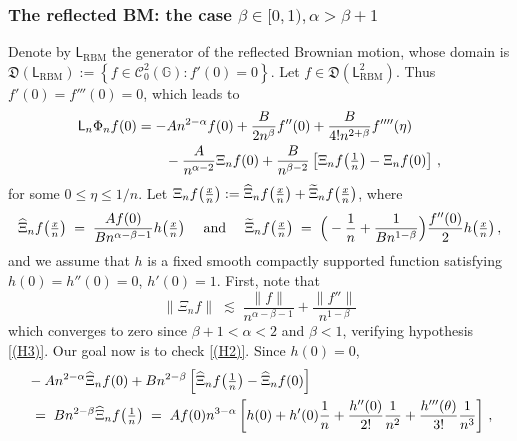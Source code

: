 \documentclass[12pt,a4paper]{article}
\theoremstyle{plain}
\theoremstyle{remark}
\newcommand{\msf}[1]{{\mathsf #1}}
\newcommand{\mc}[1]{{\mathcal #1}}
\newcommand{\mf}[1]{{\mathfrak #1}}
\newcommand{\bb}[1]{{\mathbb #1}}
\newcommand{\norm}[1]{\lVert#1\rVert}
\newcommand{\pfrac}[2]{\genfrac{}{}{}{1}{#1}{#2}}
\newcommand{\pn}[1]{\big(\pfrac{#1}{n}\big)}
\begin{document}
	\subsubsection{The reflected BM: the case \texorpdfstring{$\beta \in [0,1), \alpha >  \beta+1$}{beta in [0,1),  alpha >  beta+1}}
	
	
	
	Denote by $\msf{L}_{\text{RBM}}$ the generator of the reflected Brownian motion, whose domain is
	$
	\mf{D}(\msf{L}_{\text{RBM}}) := \left\{f \in \mc{C}_0^2(\bb{G}): f'(0) = 0\right\}$.
	Let $f \in \mf{D}(\msf{L}_{\text{RBM}}^2)$. Thus $f'(0)  = f'''(0) =0$, which leads to
	\begin{equation}\label{eq:generator_ref}
		\begin{split}
			\msf{L}_n\Phi_nf(0) &= -An^{2 - \alpha}f(0) + \frac{B}{2n^\beta}f''(0) + \frac{B}{4!n^{2 + \beta}}f''''(\eta)\\
			&\qquad  - \frac{A}{n^{\alpha - 2}}\Xi_nf(0) +\frac{B}{n^{\beta - 2}}\left[\Xi_nf\pn{1} - \Xi_nf(0)\right] \,,
		\end{split}
	\end{equation}
	for some $0\leq \eta\leq 1/n$. 
	Let $\Xi_nf\pn{x} :=    \widehat{\Xi}_nf\pn{x} + \widetilde{\Xi}_nf\pn{x}$,
	where
	\begin{align*}
		\widehat{\Xi}_nf\pn{x} \;=\; \frac{Af(0)}{Bn^{\alpha - \beta-1}}h\pn{x} \quad \text{ and }\quad \widetilde{\Xi}_nf\pn{x} \;=\; \Big(-\frac{1}{n}+ \frac{1}{Bn^{1-\beta}}\Big)\frac{f''(0)}{2}h\pn{x}\,,
	\end{align*}
	and we assume that $h$ is a fixed smooth compactly supported function satisfying $h(0) = h''(0) = 0$, $h'(0)=1$.
	First, note that
	\begin{equation}\label{eq:Xi}
		\norm{\Xi_n f} \;\lesssim\; \frac{\norm{f}}{n^{\alpha-\beta-1}} + \frac{\norm{f''}}{n^{1-\beta}}
	\end{equation}
	which converges to zero since $\beta+1<\alpha<2$ and $\beta <1$, verifying hypothesis \ref{(H3)}. Our goal now is to check \ref{(H2)}.
	Since $h(0)=0$,
	\begin{equation*}
		\begin{aligned}
			&- An^{2-\alpha }\widehat{\Xi}_nf(0)	+Bn^{2-\beta}\left[\widehat{\Xi}_nf\pn{1} - \widehat{\Xi}_nf(0)\right]\\
			&\;=\; Bn^{2-\beta}\widehat{\Xi}_nf\pn{1} \;=\; A f(0)n^{3-\alpha}\left[h(0)+h'(0)\frac{1}{n} + \frac{h''(0)}{2!}\frac{1}{n^2}+  \frac{h'''(\theta)}{3!}\frac{1}{n^3}\right]\,,
		\end{aligned}
	\end{equation*}
\end{document}

